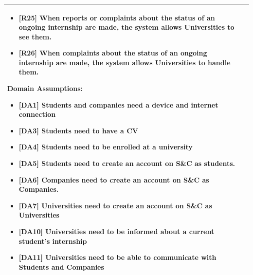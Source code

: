 \begin{longtable}{|p{}|p{}|}
\begin{itemize}
    \item \textbf{[R25]} When reports or complaints about the status of an ongoing internship are made, the system allows Universities to see them.
    \item \textbf{[R26]} When complaints about the status of an ongoing internship are made, the system allows Universities to handle them.
\end{itemize}
\textbf{Domain Assumptions:}
\begin{itemize}
    \item \textbf{[DA1]} Students and companies need a device and internet connection
     \item \textbf{[DA3]} Students need to have a CV
     \item \textbf{[DA4]} Students need to be enrolled at a university
    \item \textbf{[DA5]} Students need to create an account on S\&C as students.
    \item \textbf{[DA6]} Companies need to create an account on S\&C as Companies.
    \item \textbf{[DA7]} Universities need to create an account on S\&C as Universities
    \item \textbf{[DA10]} Universities need to be informed about a current student’s internship
    \item \textbf{[DA11]} Universities need to be able to communicate with Students and Companies

\end{itemize} \\
\hline
\end{longtable}

\pagebreak

